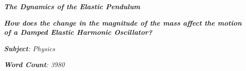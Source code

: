 

\begin{titlepage}
    \begin{center}
            
        \date{}
            
        \huge
            
            
        \vspace{0.25cm}
            
        \hline
            
        \vspace{2.5cm}
            
        \textit{\textbf{The Dynamics of the Elastic Pendulum}}
            
        \vspace{2.5cm}
            
        \LARGE
			
	\begin{flushleft}
            
        \textit{\textbf{How does the change in the magnitude of the mass affect the motion of a Damped Elastic Harmonic Oscillator? }}
            
	\end{flushleft}    
            
        \vspace{2.5cm}
            
        \Large
            
        \vspace{0.25cm}
        
		\textit{\textbf{Subject}: Physics}            

		\vspace{1cm}            
            
		\Large		
		        
		\vspace{0.25cm} 
			
	\begin{flushleft}
			


		\textit{\textbf{Word Count}: 3980}
			
	\end{flushleft}		
		   

\end{center}
\end{titlepage}
